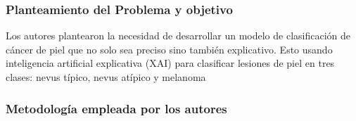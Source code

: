 \subsubsection{Planteamiento del Problema y objetivo}
Los autores plantearon la necesidad de desarrollar un modelo de clasificación de cáncer de piel que no solo sea preciso sino también explicativo. Esto usando inteligencia artificial explicativa (XAI) para clasificar lesiones de piel en tres clases: nevus típico, nevus atípico y melanoma

\subsubsection{Metodología empleada por los autores}

\newcommand{\TPSCone}{Recopilación de la data: Se uso un conjunto de datos PH2(recopilación de datos en el departamento de dermatología del Hospital Pedro Hispano)
Este conjunto de datos contiene imágenes dermatoscopia con siete características de entrada y una característica de salida.

}

\newcommand{\TPSCtwo}{ Preprocesamiento: El conjunto de datos se sometio a un proceso de preprocesamiento para mejorar su calidad y preparación para el análisis.}

\newcommand{\TPSCthree}{Extracción de características: Se extrajeron características clave de las imágenes
y usando el método chi-cuadrado se estimo la importancia de cada una de las características y se selecciono las más significativas.
}


